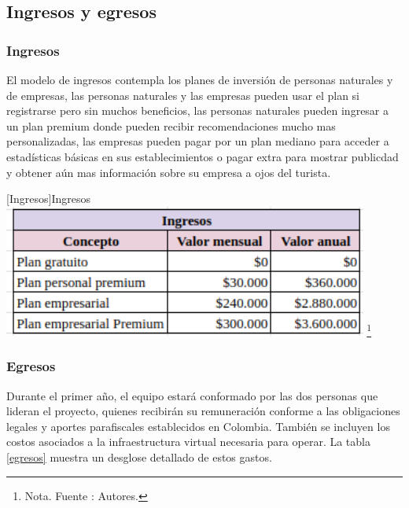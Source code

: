 \subsection{Ingresos y egresos}

\subsubsection{Ingresos}

El modelo de ingresos contempla los planes de inversión de personas naturales y de empresas, las personas naturales y las empresas pueden usar el plan si registrarse pero sin muchos beneficios, las personas naturales pueden ingresar a un plan premium donde pueden recibir recomendaciones mucho mas personalizadas, las empresas pueden pagar por un plan mediano para acceder a estadísticas básicas en sus establecimientos o pagar extra para mostrar publicdad y obtener aún mas información sobre su empresa a ojos del turista.

  \vspace{2mm}
    \begin{minipage}{0.9\textwidth}
    \centering
    [{Ingresos}]{Ingresos}
    \label{Ingresos}
    \includegraphics[width=0.9\textwidth]{Content/Images/AF/ingresos.png}
    \footnote{Nota. \textup{Fuente : Autores.}}
    \end{minipage}


\subsubsection{Egresos}
Durante el primer año, el equipo estará conformado por las dos personas que lideran el proyecto, quienes recibirán su remuneración conforme a las obligaciones legales y aportes parafiscales establecidos en Colombia. También se incluyen los costos asociados a la infraestructura virtual necesaria para operar. La tabla \ref{egresos} muestra un desglose detallado de estos gastos.


